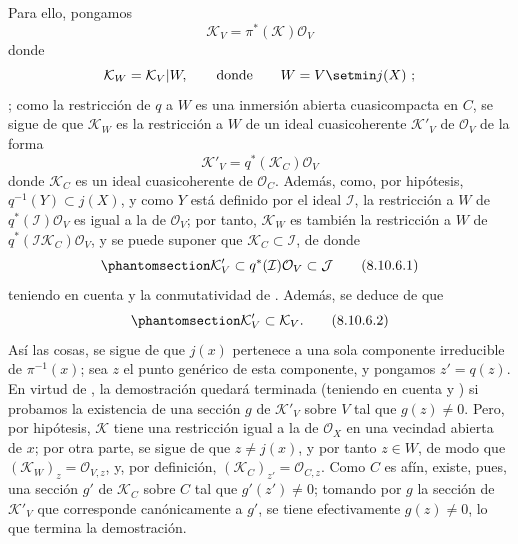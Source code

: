 \documentclass[oneside,10pt]{amsart}
\let\EGAOriginalLabel\label
\renewcommand{\label}[1]{\phantomsection\EGAOriginalLabel{#1}}
\begin{document}
\begin{env}[8.10.6]
Para ello, pongamos
\[
  \mathcal{K}_V=\pi^*(\mathcal{K})\mathcal{O}_V
\]
donde \[
  \mathcal{K}_W=\mathcal{K}_V|W,\qquad\hbox{donde}\qquad W=V\setmin j(X)~;
\];
como la restricción de $q$ a $W$ es una inmersión abierta cuasicompacta en $C$, se sigue de  que $\mathcal{K}_W$ es la restricción a $W$ de un ideal cuasicoherente $\mathcal{K}'_V$ de $\mathcal{O}_V$ de la forma
\[
  \mathcal{K}'_V=q^*(\mathcal{K}_C)\mathcal{O}_V
\]
donde $\mathcal{K}_C$ es un ideal cuasicoherente de $\mathcal{O}_C$.
Además, como, por hipótesis, $q^{-1}(Y)\subset j(X)$, y como $Y$ está definido por el ideal $\mathcal{I}$, la restricción a $W$ de $q^*(\mathcal{I})\mathcal{O}_V$ es igual a la de $\mathcal{O}_V$; por tanto, $\mathcal{K}_W$ es también la restricción a $W$ de $q^*(\mathcal{I}\mathcal{K}_C)\mathcal{O}_V$, y se puede suponer que $\mathcal{K}_C\subset\mathcal{I}$, de donde
\begin{equation}
\label{II.8.10.6.1-fr}
  \mathcal{K}'_V\subset q^*(\mathcal{I})\mathcal{O}_V\subset\mathcal{J}
\tag{8.10.6.1}
\end{equation}
teniendo en cuenta  y la conmutatividad de .
Además, se deduce de  que
\begin{equation}
\label{II.8.10.6.2-fr}
  \mathcal{K}'_V\subset\mathcal{K}_V.
\tag{8.10.6.2}
\end{equation}
Así las cosas, se sigue de  que $j(x)$ pertenece a una sola componente irreducible de $\pi^{-1}(x)$;
sea $z$ el punto genérico de esta componente, y pongamos $z'=q(z)$.
En virtud de , la demostración quedará terminada (teniendo en cuenta  y ) si probamos la existencia de una sección $g$ de $\mathcal{K}'_V$ sobre $V$ tal que $g(z)\neq0$.
Pero, por hipótesis, $\mathcal{K}$ tiene una restricción igual a la de $\mathcal{O}_X$ en una vecindad abierta de $x$;
por otra parte, se sigue de  que $z\neq j(x)$, y por tanto $z\in W$, de modo que $(\mathcal{K}_W)_z=\mathcal{O}_{V,z}$, y, por definición, $(\mathcal{K}_C)_{z'}=\mathcal{O}_{C,z}$.
Como $C$ es afín, existe, pues, una sección $g'$ de $\mathcal{K}_C$ sobre $C$ tal que $g'(z')\neq0$; tomando por $g$ la sección de $\mathcal{K}'_V$ que corresponde canónicamente a $g'$, se tiene efectivamente $g(z)\neq0$, lo que termina la demostración.
\end{env}
\end{document}
